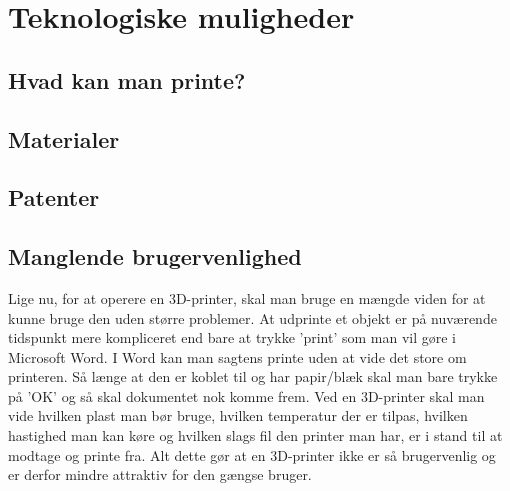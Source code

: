 \section{Teknologiske muligheder} %

\subsection{Hvad kan man printe?} %


\subsection{Materialer} %
\label{sub:materialer}


\subsection{Patenter} %
\label{sub:patenter}


\subsection{Manglende brugervenlighed} %
\label{sub:manglende_brugervenlighed}

Lige nu, for at operere en 3D-printer, skal man bruge en mængde viden for at kunne bruge den uden større problemer. At udprinte et objekt er på nuværende tidspunkt mere kompliceret end bare at trykke ’print’ som man vil gøre i Microsoft Word. I Word kan man sagtens printe uden at vide det store om printeren. Så længe at den er koblet til og har papir/blæk skal man bare trykke på ’OK’ og så skal dokumentet nok komme frem. 
Ved en 3D-printer skal man vide hvilken plast man bør bruge, hvilken temperatur der er tilpas, hvilken hastighed man kan køre og hvilken slags fil den printer man har, er i stand til at modtage og printe fra.
Alt dette gør at en 3D-printer ikke er så brugervenlig og er derfor mindre attraktiv for den gængse bruger.



